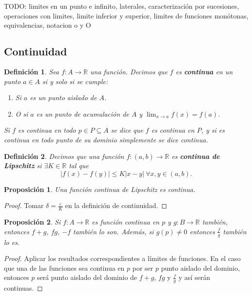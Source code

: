 \documentclass{article}
\newtheorem{prop}{Proposición}
\newtheorem{define}{Definición}
\newcommand{\reales}{\mathbb{R}}
\begin{document}
TODO: limites en un punto e infinito, laterales, caracterización por sucesiones, operaciones con limites, limite inferior y superior, limites de funciones monótonas, equivalencias, notacion o y O

\subsection{Continuidad}
\begin{define}
	Sea $f: A \rightarrow \reales$ una función. Decimos que $f$ es \textbf{continua} en un punto $a \in A$ si y solo si se cumple:
	\begin{enumerate}
		\item
		Si $a$ es un punto aislado de $A$.
		\item
		O si $a$ es un punto de acumulación de $A$ y $\lim_{x \rightarrow a} f(x) = f(a)$.
	\end{enumerate}
	Si $f$ es continua en todo $p \in P \subseteq A$ se dice que $f$ es continua en $P$, y si es continua en todo punto de su dominio simplemente se dice continua.
\end{define}

\begin{define}
	Decimos que una función $f: (a, b) \rightarrow \reales$ es \textbf{continua de Lipschitz} si $\exists K \in \reales$ tal que
	\begin{equation*}
		|f(x) - f(y)| \leq K|x - y|\ \forall x,y \in (a, b).
	\end{equation*}
\end{define}

\begin{prop}
	Una función continua de Lipschitz es continua.
\end{prop}

\begin{proof}
	Tomar $\delta = \frac{\varepsilon}{K}$ en la definición de continuidad. 
\end{proof}

\begin{prop}
	Si $f: A \rightarrow \reales$ es función continua en $p$ y $g: B \rightarrow \reales$ también, entonces $f + g$, $fg$, $-f$ también lo son. Además, si $g(p) \neq 0$ entonces $\frac{f}{g}$ también lo es.
\end{prop}

\begin{proof}
	Aplicar los resultados correspondientes a límites de funciones. En el caso que una de las funciones sea continua en $p$ por ser $p$ punto aislado del dominio, entonces $p$ será punto aislado del dominio de $f+g$, $fg$ y $\frac{f}{g}$ y así serán continuas.
\end{proof}
\end{document}
